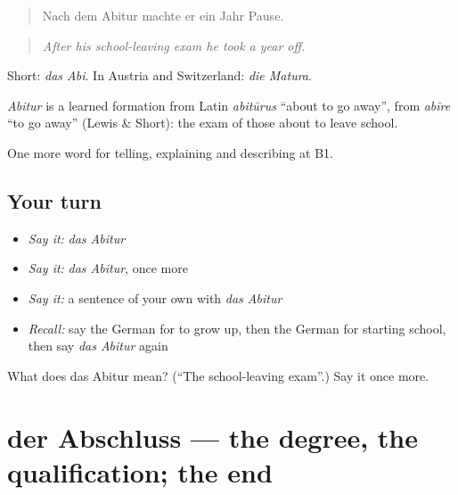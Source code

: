 \begin{quote}
Nach dem Abitur machte er ein Jahr Pause.
\end{quote}

\begin{quote}
\emph{After his school-leaving exam he took a year off.}
\end{quote}

Short: \emph{das Abi}. In Austria and Switzerland: \emph{die Matura}.

\begin{cousinweb}
\emph{Abitur} is a learned formation from Latin \emph{abitūrus} \textquotedblleft{}about to go away\textquotedblright{}, from \emph{abīre} \textquotedblleft{}to go away\textquotedblright{} (Lewis \& Short): the exam of those about to leave school.
\end{cousinweb}

\begin{grammarlens}[title={What you've built}]
One more word for telling, explaining and describing at B1.
\end{grammarlens}

\subsection*{Your turn}
\begin{itemize}
\raggedright
  \item \emph{Say it:} \emph{das Abitur}
  \item \emph{Say it:} \emph{das Abitur}, once more
  \item \emph{Say it:} a sentence of your own with \emph{das Abitur}
  \item \emph{Recall:} say the German for to grow up, then the German for starting school, then say \emph{das Abitur} again
\end{itemize}

\begin{tcolorbox}[breakable,colback=teal!4,colframe=teal!35!black,title={Before you move on}]
What does das Abitur mean? (\textquotedblleft{}The school-leaving exam\textquotedblright{}.) Say it once more.
\end{tcolorbox}
\section[der Abschluss]{der Abschluss — the degree, the qualification; the end}

\label{lesson:GE-C297-abschluss}



